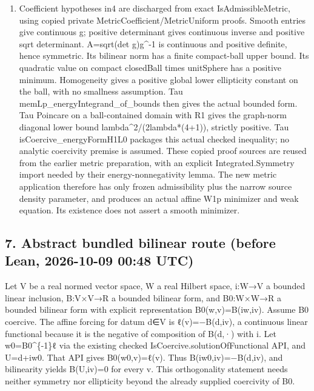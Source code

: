 \documentclass[11pt]{article}
\theoremstyle{definition}
\theoremstyle{remark}
\numberwithin{equation}{section}
\providecommand{\tightlist}{}
\begin{document}
\begin{enumerate}
\def\labelenumi{\arabic{enumi}.}
\setcounter{enumi}{5}
\tightlist
\item
  Coefficient hypotheses in4 are discharged from exact
  IsAdmissibleMetric, using copied private
  MetricCoefficient/MetricUniform proofs. Smooth entries give continuous
  g; positive determinant gives continuous inverse and positive sqrt
  determinant. A=sqrt(det g)g\^{}-1 is continuous and positive definite,
  hence symmetric. Its bilinear norm has a finite compact-ball upper
  bound. Its quadratic value on compact closedBall times unitSphere has
  a positive minimum. Homogeneity gives a positive global lower
  ellipticity constant on the ball, with no smallness assumption. Tau
  memLp\_energyIntegrand\_of\_bounds then gives the actual bounded form.
  Tau Poincare on a ball-contained domain with R1 gives the graph-norm
  diagonal lower bound lambda\^{}2/(2lambda*(4+1)), strictly positive.
  Tau isCoercive\_energyFormH1L0 packages this actual checked
  inequality; no analytic coercivity premise is assumed. These copied
  proof sources are reused from the earlier metric preparation, with an
  explicit Integrated.Symmetry import needed by their
  energy-nonnegativity lemma. The new metric application therefore has
  only frozen admissibility plus the narrow source density parameter,
  and produces an actual affine W1p minimizer and weak equation. Its
  existence does not assert a smooth minimizer.
\end{enumerate}

\hypertarget{source-e1387282d54f-abstract-bundled-bilinear-route-before-lean-2026-10-09-0048-utc}{%
\subsection{7. Abstract bundled bilinear route (before Lean, 2026-10-09
00:48
UTC)}\label{source-e1387282d54f-abstract-bundled-bilinear-route-before-lean-2026-10-09-0048-utc}}

Let V be a real normed vector space, W a real Hilbert space, i:W→V a
bounded linear inclusion, B:V×V→R a bounded bilinear form, and B0:W×W→R
a bounded bilinear form with explicit representation B0(w,v)=B(iw,iv).
Assume B0 coercive. The affine forcing for datum d∈V is ℓ(v)=−B(d,iv), a
continuous linear functional because it is the negative of composition
of B(d,·) with i. Let w0=B0\^{}\{-1\}ℓ via the existing checked
IsCoercive.solutionOfFunctional API, and U=d+iw0. That API gives
B0(w0,v)=ℓ(v). Thus B(iw0,iv)=−B(d,iv), and bilinearity yields B(U,iv)=0
for every v. This orthogonality statement needs neither symmetry nor
ellipticity beyond the already supplied coercivity of B0.
\end{document}
